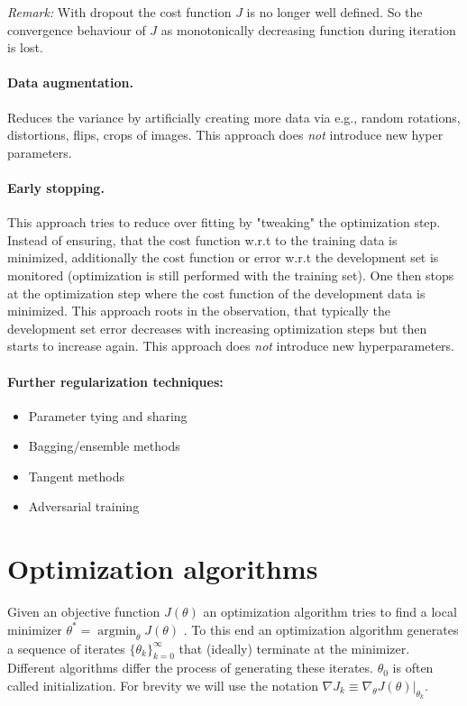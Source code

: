 \documentclass[12pt,a4paper]{article}
\begin{document}
\textit{Remark:} With dropout the cost function $J$ is no longer well defined. So the convergence behaviour of $J$ as monotonically decreasing function during iteration is lost.

\paragraph{Data augmentation.} Reduces the variance by artificially creating more data via e.g., random rotations, distortions, flips, crops of images. This approach does \textit{not} introduce new hyper parameters.

\paragraph{Early stopping.} This approach tries to reduce over fitting by "tweaking"  the optimization step. Instead of ensuring, that the cost function w.r.t to the training data is minimized, additionally the cost function or error w.r.t the development set is monitored (optimization is still performed with the training set). One then stops at the optimization step where the cost function of the development data is minimized. This approach roots in the observation, that typically the development set error decreases with increasing optimization steps but then starts to increase again. This approach does \textit{not} introduce new hyperparameters.

\paragraph{Further regularization techniques\cite{Srihari:regularization_talk}:}
\begin{itemize}
	\setlength\itemsep{0em}
	\item Parameter tying and sharing
	\item Bagging/ensemble methods
	\item Tangent methods
	\item Adversarial training
\end{itemize}

\section{Optimization algorithms} \label{sec:optimizers}
Given an objective function $J(\theta)$ an optimization algorithm tries to find a local minimizer $\theta ^* = \operatorname{argmin}_\theta J(\theta)$ \cite{NoceWrig06}. To this end an optimization algorithm generates a sequence of iterates $\{\theta_k\}_{k=0} ^\infty$ that (ideally) terminate at the minimizer. Different algorithms differ the process of generating these iterates. $\theta_0$ is often called initialization. For brevity we will use the notation $\nabla J_k \equiv \nabla_\theta J(\theta)\rvert_{\theta_k}$.   
\end{document}
